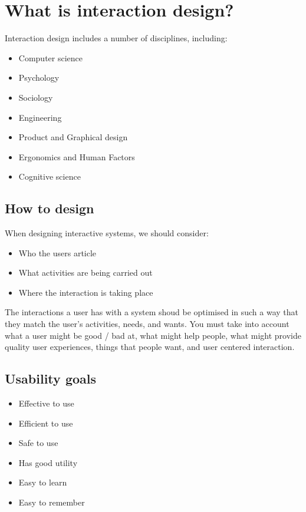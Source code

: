 \section{What is interaction design?}

Interaction design includes a number of disciplines, including:

\begin{itemize}
    \item Computer science
    \item Psychology
    \item Sociology
    \item Engineering
    \item Product and Graphical design
    \item Ergonomics and Human Factors
    \item Cognitive science
\end{itemize}


\subsection{How to design}

When designing interactive systems, we should consider:

\begin{itemize}
    \item Who the users article
    \item What activities are being carried out
    \item Where the interaction is taking place
\end{itemize}

The interactions a user has with a system shoud be optimised in such a way that they match the user's activities, needs, and wants.
You must take into account what a user might be good / bad at, what might help people, what might provide
quality user experiences, things that people want, and user centered interaction.


\subsection{Usability goals}

\begin{itemize}
    \item Effective to use
    \item Efficient to use
    \item Safe to use 
    \item Has good utility 
    \item Easy to learn 
    \item Easy to remember
\end{itemize}


